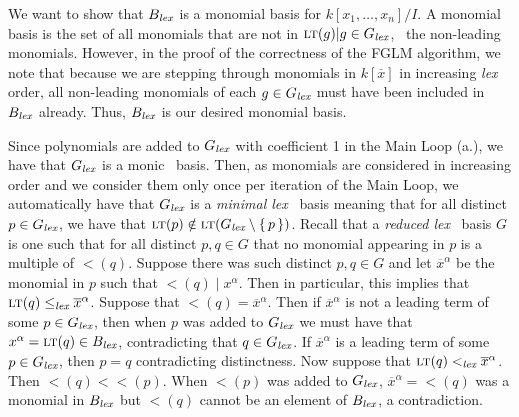 \documentclass[letterpaper, 11pt, oneside]{book}
\begin{document}
\begin{sol}\label{ex:UAG_2.3.4}
  We want to show that $B_{\emph{lex}}$ is a monomial basis for $k[x_{1}, \ldots, x_{n}] / I$.
  A monomial basis is the set of all monomials that are not in $\ideal{\lt(g) | g \in G_{\emph{lex}}}$, \ie\ the non-leading monomials.
  However, in the proof of the correctness of the FGLM algorithm, we note that because we are stepping through monomials in $k[\overline{x}]$ in increasing \emph{lex} order, all non-leading monomials of each $g \in G_{\emph{lex}}$ must have been included in $B_{\emph{lex}}$ already.
  Thus, $B_{\emph{lex}}$ is our desired monomial basis.
\end{sol}

\clearpage

\begin{sol}\label{ex:UAG_2.3.7}
  Since polynomials are added to $G_{\emph{lex}}$ with coefficient 1 in the Main Loop (a.), we have that $G_{\emph{lex}}$ is a monic \Grobner\ basis.
  Then, as monomials are considered in increasing order and we consider them only once per iteration of the Main Loop, we automatically have that $G_{\emph{lex}}$ is a \emph{minimal lex} \Grobner\ basis meaning that for all distinct $p \in G_{\emph{lex}}$, we have that $\lt(p) \notin \ideal{\lt(G_{\emph{lex}} \setminus \set{p})}$.
  Recall that a \emph{reduced lex} \Grobner\ basis $G$ is one such that for all distinct $p, q \in G$ that no monomial appearing in $p$ is a multiple of $\lt(q)$.
  Suppose there was such distinct $p, q \in G$ and let $\overline{x}^{\alpha}$ be the monomial in $p$ such that $\lt(q) \mid x^{\alpha}$.
  Then in particular, this implies that $\operatorname{\textsc{lt}}(q) \leq_{\emph{lex}} \overline{x}^{\alpha}$.
  Suppose that $\lt(q) = \overline{x}^{\alpha}$.
  Then if $\overline{x}^{\alpha}$ is not a leading term of some $p \in G_{\emph{lex}}$, then when $p$ was added to $G_{\emph{lex}}$ we must have that $x^{\alpha} = \operatorname{\textsc{lt}}(q) \in B_{\emph{lex}}$, contradicting that $q \in G_{\emph{lex}}$.
  If $\overline{x}^{\alpha}$ is a leading term of some $p \in G_{\emph{lex}}$, then $p = q$ contradicting distinctness.
  Now suppose that $\operatorname{\textsc{lt}}(q) <_{\emph{lex}} \overline{x}^{\alpha}$.
  Then $\lt(q) < \lt(p)$.
  When $\lt(p)$ was added to $G_{\emph{lex}}$, $\overline{x}^{\alpha} = \lt(q)$ was a monomial in $B_{\emph{lex}}$ but $\lt(q)$ cannot be an element of $B_{\emph{lex}}$, a contradiction.
\end{sol}
\end{document}
